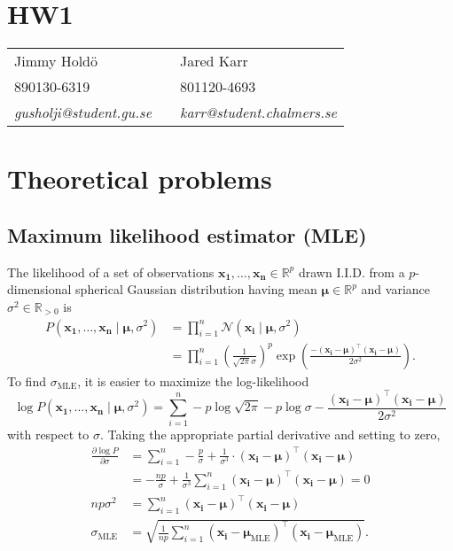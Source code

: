 \documentclass[a4paper,11pt]{article}
\DeclareMathOperator{\given}{\mid}
\begin{document}
\section*{HW1}

\begin{tabular*}{0.9\textwidth}{@{\extracolsep{\fill} } lll}
Jimmy Hold\"{o} & & Jared Karr\\
890130-6319 & & 801120-4693\\
\it{gusholji@student.gu.se} & & \it{karr@student.chalmers.se}\\
\end{tabular*}

\section{Theoretical problems}
\subsection{Maximum likelihood estimator (MLE)}
The likelihood of a set of observations $\mathbf{x_1},\dots,\mathbf{x_n}\in\mathbb{R}^p$ drawn I.I.D. from a $p$-dimensional spherical Gaussian distribution having mean $\boldsymbol\mu\in\mathbb{R}^p$ and variance $\sigma^2\in\mathbb{R}_{>0}$ is
\begin{align*}
  P(\mathbf{x_1},\dots,\mathbf{x_n}\given \boldsymbol\mu,\sigma^2)
    &=\prod_{i=1}^n\mathcal{N}(\mathbf{x_i}\given \boldsymbol\mu, \sigma^2)\\
    &=\prod_{i=1}^n\left(
        \frac{1}{\sqrt{2\pi}\sigma}
      \right)^p\exp\left(
        \frac{-(\mathbf{x_i}-\boldsymbol\mu)^\top(\mathbf{x_i}-\boldsymbol\mu)}
             {2\sigma^2}
      \right).
\end{align*}
To find $\sigma_\textrm{MLE}$, it is easier to maximize the log-likelihood
\begin{equation*}
  \log P(\mathbf{x_1},\dots,\mathbf{x_n}\given\boldsymbol\mu,\sigma^2)
    =\sum_{i=1}^n
      -p\log\sqrt{2\pi}
      -p\log\sigma
      -\frac{(\mathbf{x_i}-\boldsymbol\mu)^\top(\mathbf{x_i}-\boldsymbol\mu)}{2\sigma^2} 
\end{equation*}
with respect to $\sigma$. Taking the appropriate partial derivative and setting to zero,
\begin{align*}
\frac{\partial\log P}{\partial\sigma}
  &=\sum_{i=1}^n
    -\frac{p}{\sigma}
    +\frac{1}{\sigma^3}\cdot(\mathbf{x_i}-\boldsymbol\mu)^\top(\mathbf{x_i}-\boldsymbol\mu)\\
  &=-\frac{np}{\sigma}
    +\frac{1}{\sigma^3}\sum_{i=1}^n(\mathbf{x_i}-\boldsymbol\mu)^\top(\mathbf{x_i}-\boldsymbol\mu)=0\\
np\sigma^2
  &=\sum_{i=1}^n(\mathbf{x_i}-\boldsymbol\mu)^\top(\mathbf{x_i}-\boldsymbol\mu)\\
\sigma_\textrm{MLE}&=\sqrt{\frac{1}{np}\sum_{i=1}^n(\mathbf{x_i}-\boldsymbol\mu_\textrm{MLE})^\top(\mathbf{x_i}-\boldsymbol\mu_\textrm{MLE})}.
\end{align*}
\end{document}
